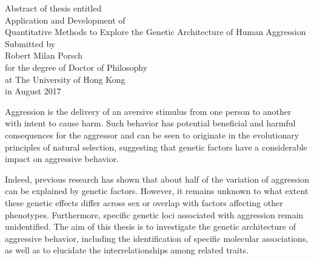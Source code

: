 \documentclass[header.tex]{subfiles}
\begin{document}
\begin{center}
  Abstract of thesis entitled \\
  \vspace*{\baselineskip}
  {\LARGE Application and Development of \\ Quantitative Methods to Explore the Genetic Architecture of Human Aggression}\\[0.2\baselineskip]
  \vspace*{\baselineskip}
  Submitted by\\
  \vspace*{\baselineskip}
  {\LARGE Robert Milan Porsch}\\
  \vspace*{\baselineskip}
  for the degree of Doctor of Philosophy \\ at The University of Hong Kong \\ in August 2017
\end{center}



Aggression is the delivery of an aversive stimulus from one person to another with intent to cause harm.
Such behavior has potential beneficial and harmful consequences for the aggressor and can be seen to originate in the evolutionary principles of natural selection,
suggesting that genetic factors have a considerable impact on aggressive behavior.

Indeed, previous research has shown that about half of the variation of aggression can be explained by genetic factors.
However, it remains unknown to what extent these genetic effects differ across sex or overlap with factors affecting other phenotypes.
Furthermore, specific genetic loci associated with aggression remain unidentified.
The aim of this thesis is to investigate the  genetic architecture of aggressive behavior, including the identification of specific molecular associations, as well as to elucidate the interrelationships among related traits. 
\end{document}
